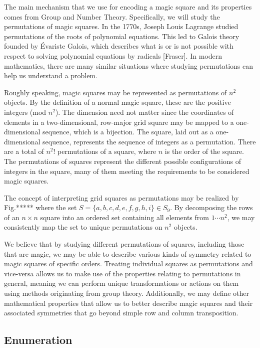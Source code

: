 \documentclass{rhumj_new}
\begin{document}
The main mechanism that we use for encoding a magic square and its properties comes from Group
and Number Theory. Specifically, we will study the permutations of magic squares. In the 1770s,
Joseph Louis Lagrange studied permutations of the roots of polynomial equations. This led to Galois
theory founded by Évariste Galois, which describes what is or is not possible with respect to
solving polynomial equations by radicals [Fraser]. In modern mathematics, there are many similar
situations where studying permutations can help us understand a problem.

Roughly speaking, magic squares may be represented as permutations of $n^2$ objects. By the
definition of a normal magic square, these are the positive integers (mod $n^2$). The dimension
need not matter since the coordinates of elements in a two-dimensional, row-major grid square may
be mapped to a one-dimensional sequence, which is a bijection. The square, laid out as a
one-dimensional sequence, represents the sequence of integers as a permutation. There are a total
of $n^{2}$! permutations of a square, where $n$ is the order of the square. The permutations of
squares represent the different possible configurations of integers in the square, many of them
meeting the requirements to be considered magic squares.

The concept of interpreting grid squares as permutations may be realized by
Fig.***** where the set $S = \{a, b, c, d, e, f, g, h, i\} \in S_9$. By decomposing
the rows of an $n\times n$ square into an ordered set containing all elements from $1\cdots n^2$,
we may consistently map the set to unique permutations on $n^2$ objects.

We believe that by studying different permutations of squares, including those that are magic,
we may be able to describe various kinds of symmetry related to magic squares of specific orders.
Treating individual squares as permutations and vice-versa allows us to make use of the properties
relating to permutations in general, meaning we can perform unique transformations or actions on
them using methods originating from group theory. Additionally, we may define other mathematical
properties that allow us to better describe magic squares and their associated symmetries that go
beyond simple row and column transposition.

\subsection{Enumeration}
\end{document}
